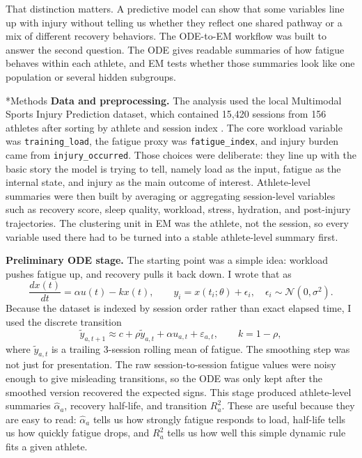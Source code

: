 \documentclass[11pt]{article}
\makeatletter
\renewcommand\section{\@startsection{section}{1}{0pt}{0.38em}{0.14em}{\bfseries\normalsize}}
\makeatother
\begin{document}
That distinction matters. A predictive model can show that some variables line up with injury without telling us whether they reflect one shared pathway or a mix of different recovery behaviors. The ODE-to-EM workflow was built to answer the second question. The ODE gives readable summaries of how fatigue behaves within each athlete, and EM tests whether those summaries look like one population or several hidden subgroups. 

\section*{Methods}
\textbf{Data and preprocessing.}
The analysis used the local Multimodal Sports Injury Prediction dataset, which contained 15{,}420 sessions from 156 athletes after sorting by athlete and session index \cite{Dataset2025}. The core workload variable was \texttt{training\_load}, the fatigue proxy was \texttt{fatigue\_index}, and injury burden came from \texttt{injury\_occurred}. Those choices were deliberate: they line up with the basic story the model is trying to tell, namely load as the input, fatigue as the internal state, and injury as the main outcome of interest. Athlete-level summaries were then built by averaging or aggregating session-level variables such as recovery score, sleep quality, workload, stress, hydration, and post-injury trajectories. The clustering unit in EM was the athlete, not the session, so every variable used there had to be turned into a stable athlete-level summary first.

\textbf{Preliminary ODE stage.}
The starting point was a simple idea: workload pushes fatigue up, and recovery pulls it back down. I wrote that as
\[
\frac{dx(t)}{dt}=\alpha u(t)-k x(t),
\qquad
y_i=x(t_i;\theta)+\epsilon_i,\quad \epsilon_i\sim\mathcal{N}(0,\sigma^2).
\]
Because the dataset is indexed by session order rather than exact elapsed time, I used the discrete transition
\[
\tilde y_{a,t+1}\approx c+\rho \tilde y_{a,t}+\alpha u_{a,t}+\varepsilon_{a,t},
\qquad k=1-\rho,
\]
where $\tilde y_{a,t}$ is a trailing 3-session rolling mean of fatigue. The smoothing step was not just for presentation. The raw session-to-session fatigue values were noisy enough to give misleading transitions, so the ODE was only kept after the smoothed version recovered the expected signs. This stage produced athlete-level summaries $\hat\alpha_a$, recovery half-life, and transition $R^2_a$. These are useful because they are easy to read: $\hat\alpha_a$ tells us how strongly fatigue responds to load, half-life tells us how quickly fatigue drops, and $R^2_a$ tells us how well this simple dynamic rule fits a given athlete.
\end{document}
